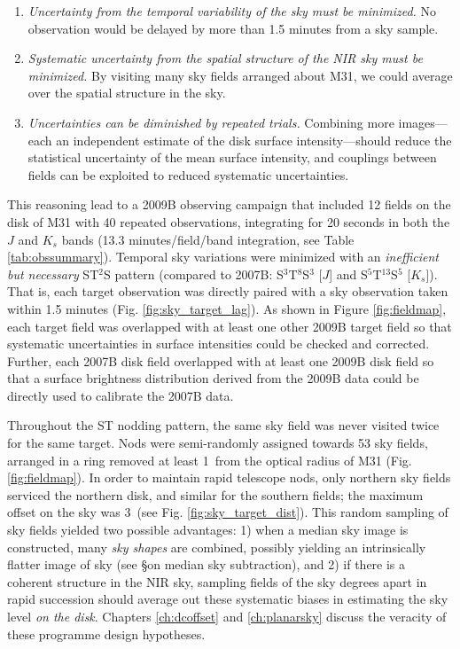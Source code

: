\documentclass[iop]{emulateapj}
\begin{document}
\begin{enumerate}
    \item \emph{Uncertainty from the temporal variability of the sky must be minimized.} No observation would be delayed by more than 1.5 minutes from a sky sample.
    \item \emph{Systematic uncertainty from the spatial structure of the NIR sky must be minimized.} By visiting many sky fields arranged about M31, we could average over the spatial structure in the sky.
    \item \emph{Uncertainties can be diminished by repeated trials.} Combining more images---each an independent estimate of the disk surface intensity---should reduce the statistical uncertainty of the mean surface intensity, and couplings between fields can be exploited to reduced systematic uncertainties.
\end{enumerate}

This reasoning lead to a 2009B observing campaign that included 12 fields on the disk of M31 with 40 repeated observations, integrating for 20 seconds in both the $J$ and $K_s$ bands (13.3 minutes/field/band integration, see Table \ref{tab:obssummary}). Temporal sky variations were minimized with an \emph{inefficient but necessary} ST$^2$S pattern (compared to 2007B: S$^3$T$^8$S$^3$ [$J$] and S$^5$T$^{13}$S$^5$ [$K_s$]). That is, each target observation was directly paired with a sky observation taken within 1.5 minutes (Fig. \ref{fig:sky_target_lag}). As shown in Figure \ref{fig:fieldmap}, each target field was overlapped with at least one other 2009B target field so that systematic uncertainties in surface intensities could be checked and corrected. Further, each 2007B disk field overlapped with at least one 2009B disk field so that a surface brightness distribution derived from the 2009B data could be directly used to calibrate the 2007B data.

Throughout the ST nodding pattern, the same sky field was never visited twice for the same target. Nods were semi-randomly assigned towards 53 sky fields, arranged in a ring removed at least 1\arcdeg\ from the optical radius of M31 (Fig. \ref{fig:fieldmap}). In order to maintain rapid telescope nods, only northern sky fields serviced the northern disk, and similar for the southern fields; the maximum offset on the sky was 3\arcdeg\ (see Fig. \ref{fig:sky_target_dist}). This random sampling of sky fields yielded two possible advantages: 1) when a median sky image is constructed, many \emph{sky shapes} are combined, possibly yielding an intrinsically flatter image of sky (see \S on median sky subtraction), and 2) if there is a coherent structure in the NIR sky, sampling fields of the sky degrees apart in rapid succession should average out these systematic biases in estimating the sky level \emph{on the disk}. Chapters \ref{ch:dcoffset} and \ref{ch:planarsky} discuss the veracity of these programme design hypotheses.
\end{document}
